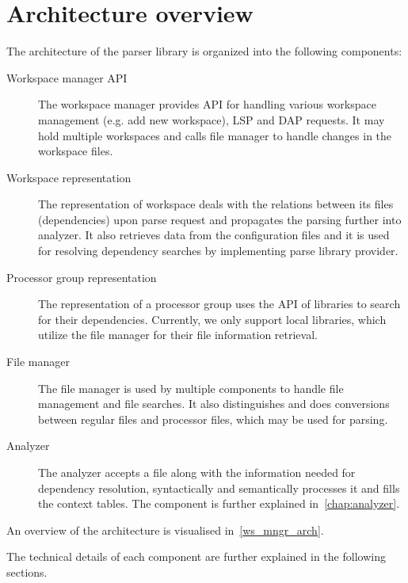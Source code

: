 \section{Architecture overview}
The architecture of the parser library is organized into the following components:

\begin{description}
	\item[Workspace manager API] The workspace manager provides API for handling various workspace management (e.g. add new workspace), LSP and DAP requests. It may hold multiple workspaces and calls 
	file manager to handle changes in the workspace files.
	\item[Workspace representation] The representation of workspace deals with the relations between its files (dependencies) upon parse request and propagates the parsing further into analyzer. It also retrieves data from the configuration files and it is used for resolving dependency searches by implementing parse library provider.
	\item[Processor group representation]  
	The representation of a processor group uses the API of libraries to search for their dependencies. Currently, we only support local libraries, which utilize the file manager for their file information retrieval.
	\item[File manager] 
	The file manager is used by multiple components to handle file management and file searches. It also distinguishes and does conversions between regular files and processor files, which may be used for parsing.
	\item[Analyzer] The analyzer accepts a file along with the information needed for dependency resolution, syntactically and semantically processes it and fills the context tables. The component is further explained in~\cref{chap:analyzer}.
\end{description}

An overview of the architecture is visualised in~\cref{ws_mngr_arch}.

The technical details of each component are further explained in the following sections.


